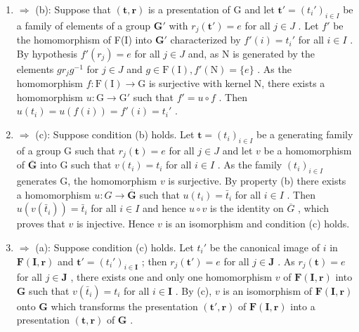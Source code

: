 \begin{enumerate}
\def\labelenumi{(\alph{enumi})}
\item
  \(\Rightarrow\) (b): Suppose that \((\mathbf{t},\mathbf{r})\) is a presentation of G and let \(\mathbf{t}' = (t_i')_{i\in I}\) be a family of elements of a group \(\mathbf{G}'\) with \(r_j(\mathbf{t}') = e\) for all \(j\in J\) . Let \(f'\) be the homomorphism of F(I) into \(\mathbf{G}'\) characterized by \(f'(i) = t_i'\) for all \(i\in I\) . By hypothesis \(f'(r_j) = e\) for all \(j\in J\) and, as N is generated by the elements \(gr_jg^{-1}\) for \(j\in J\) and \(g\in \mathrm{F}(\mathrm{I}),f'(\mathrm{N}) = \{e\}\) . As the homomorphism \(f\colon \mathrm{F}(\mathrm{I})\to \mathrm{G}\) is surjective with kernel N, there exists a homomorphism \(u\colon \mathrm{G}\to \mathrm{G}'\) such that \(f' = u\circ f\) . Then \(u(t_i) = u(f(i)) = f'(i) = t_i'\) .
\item
  \(\Rightarrow\) (c): Suppose condition (b) holds. Let \(\mathbf{t} = (t_i)_{i\in I}\) be a generating family of a group G such that \(r_j(\mathbf{t}) = e\) for all \(j\in J\) and let \(v\) be a homomorphism of \(\overline{\mathbf{G}}\) into G such that \(v(t_i) = t_i\) for all \(i\in I\) . As the family \((t_i)_{i\in I}\) generates G, the homomorphism \(v\) is surjective. By property (b) there exists a homomorphism \(u\colon G\to \overline{\mathbf{G}}\) such that \(u(t_i) = \bar{t}_i\) for all \(i\in I\) . Then \(u(v(\bar{t}_i)) = \bar{t}_i\) for all \(i\in I\) and hence \(u \circ v\) is the identity on \(\overline{G}\) , which proves that \(v\) is injective. Hence \(v\) is an isomorphism and condition (c) holds.
\item
  \(\Rightarrow\) (a): Suppose condition (c) holds. Let \(t_i'\) be the canonical image of \(i\) in \(\mathbf{F}(\mathbf{I},\mathbf{r})\) and \(\mathbf{t}' = (t_i')_{i\in \mathbf{I}}\) ; then \(r_j(\mathbf{t}') = e\) for all \(j\in \mathbf{J}\) . As \(r_j(\mathbf{t}) = e\) for all \(j\in \mathbf{J}\) , there exists one and only one homomorphism \(v\) of \(\mathbf{F}(\mathbf{I},\mathbf{r})\) into \(\mathbf{G}\) such that \(v(\bar{t}_i) = t_i\) for all \(i\in \mathbf{I}\) . By (c), \(v\) is an isomorphism of \(\mathbf{F}(\mathbf{I},\mathbf{r})\) onto \(\mathbf{G}\) which transforms the presentation \((\mathbf{t}',\mathbf{r})\) of \(\mathbf{F}(\mathbf{I},\mathbf{r})\) into a presentation \((\mathbf{t},\mathbf{r})\) of \(\mathbf{G}\) .
\end{enumerate}

